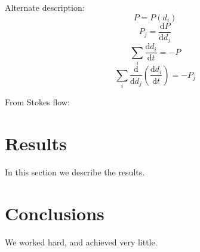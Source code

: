 \documentclass[12pt]{article}
\newcommand{\deriv}[2]{\ensuremath{\frac{\mathrm{d}#1}{\mathrm{d}#2}}}
\begin{document}
Alternate description:
  \[ P = P\left( d_i \right) \]
  \[ P_j = \deriv{P}{d_j} \]
  \[ \sum_i \deriv{d_i}{t} = -P \]
  \[ \sum_i \deriv{}{d_j}\left( \deriv{d_i}{t} \right) = -P_j \]

From Stokes flow:

\section{Results}\label{results}
In this section we describe the results.

\section{Conclusions}\label{conclusions}
We worked hard, and achieved very little.



\end{document}
